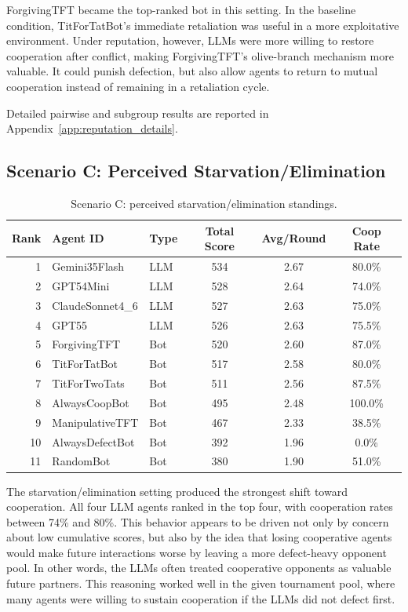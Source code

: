 \documentclass[11pt]{article}
\begin{document}
ForgivingTFT became the top-ranked bot in this setting. In the baseline condition, TitForTatBot's immediate retaliation was useful in a more exploitative environment. Under reputation, however, LLMs were more willing to restore cooperation after conflict, making ForgivingTFT's olive-branch mechanism more valuable. It could punish defection, but also allow agents to return to mutual cooperation instead of remaining in a retaliation cycle.

Detailed pairwise and subgroup results are reported in Appendix~\ref{app:reputation_details}.


\subsection{Scenario C: Perceived Starvation/Elimination}

\begin{table}[H]
\centering
\caption{Scenario C: perceived starvation/elimination standings.}
\small
\begin{tabular}{rllccc}
\toprule
Rank & Agent ID & Type & Total Score & Avg/Round & Coop Rate \\
\midrule
1 & Gemini35Flash & LLM & 534 & 2.67 & 80.0\% \\
2 & GPT54Mini & LLM & 528 & 2.64 & 74.0\% \\
3 & ClaudeSonnet4\_6 & LLM & 527 & 2.63 & 75.0\% \\
4 & GPT55 & LLM & 526 & 2.63 & 75.5\% \\
5 & ForgivingTFT & Bot & 520 & 2.60 & 87.0\% \\
6 & TitForTatBot & Bot & 517 & 2.58 & 80.0\% \\
7 & TitForTwoTats & Bot & 511 & 2.56 & 87.5\% \\
8 & AlwaysCoopBot & Bot & 495 & 2.48 & 100.0\% \\
9 & ManipulativeTFT & Bot & 467 & 2.33 & 38.5\% \\
10 & AlwaysDefectBot & Bot & 392 & 1.96 & 0.0\% \\
11 & RandomBot & Bot & 380 & 1.90 & 51.0\% \\
\bottomrule
\end{tabular}
\end{table}

The starvation/elimination setting produced the strongest shift toward cooperation. All four LLM agents ranked in the top four, with cooperation rates between 74\% and 80\%. This behavior appears to be driven not only by concern about low cumulative scores, but also by the idea that losing cooperative agents would make future interactions worse by leaving a more defect-heavy opponent pool. In other words, the LLMs often treated cooperative opponents as valuable future partners. This reasoning worked well in the given tournament pool, where many agents were willing to sustain cooperation if the LLMs did not defect first.
\end{document}
